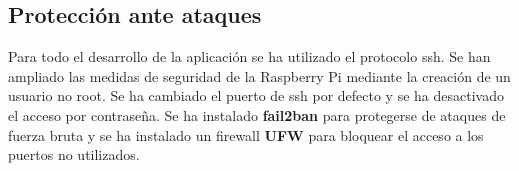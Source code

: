 \subsection{Protección ante ataques}

Para todo el desarrollo de la aplicación se ha utilizado el protocolo ssh.
Se han ampliado las medidas de seguridad de la Raspberry Pi mediante la creación de un usuario no root. Se ha cambiado el puerto de ssh por defecto y se ha desactivado el acceso por contraseña. Se ha instalado \textbf{fail2ban} para protegerse de ataques de fuerza bruta y se ha instalado un firewall \textbf{UFW} para bloquear el acceso a los puertos no utilizados. 